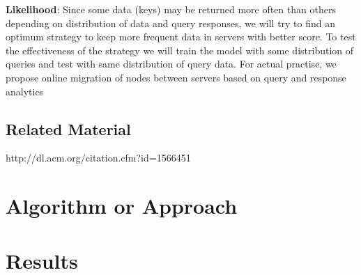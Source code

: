 \documentclass[twocolumn]{article}
\newcommand{\comment}[1]{}
\begin{document}
\textbf{Likelihood}: Since some data (keys) may be returned more often than others depending on distribution of data and query responses, we will try to find an optimum strategy to keep more frequent data in servers with better score. To test the effectiveness of the strategy we will train the model with some distribution of queries and test with same distribution of query data. For actual practise, we propose online migration of nodes between servers based on query and response analytics
\subsection{Related Material}

http://dl.acm.org/citation.cfm?id=1566451
\comment{

Can also comment out paragraphs, etc.

}

\section{Algorithm or Approach}


\comment{

\begin{algorithm}[t]
	\caption{Indexing}
	\label{alg:indexing}
	\begin{algorithmic}[1]
		\Require Database $D$, Query $Q$
		\Ensure Result set $A$
		\State $A \gets$ Search($Q$, $D$)
		\State \Return $A$
	\end{algorithmic}
\end{algorithm}

And refer as Algorithm \ref{alg:indexing}.

}


\comment{

Use the following format for figures:

\begin{figure}[t]
	\centering
	\texttt{[image: figure\_file]}
	\caption{This figure explains this.}
	\label{fig:block}
\end{figure}

And refer as Figure \ref{fig:block}.

}

\section{Results}
\end{document}
